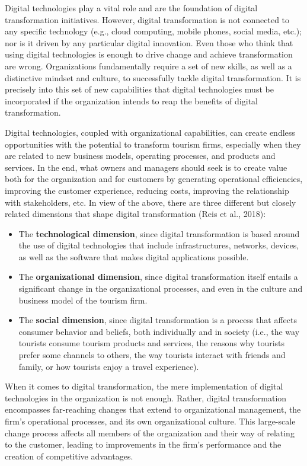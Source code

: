 \documentclass[
  letterpaper,
  DIV=11,
  numbers=noendperiod]{scrreprt}
\begin{document}
Digital technologies play a vital role and are the foundation of digital
transformation initiatives. However, digital transformation is not
connected to any specific technology (e.g., cloud computing, mobile
phones, social media, etc.); nor is it driven by any particular digital
innovation. Even those who think that using digital technologies is
enough to drive change and achieve transformation are wrong.
Organizations fundamentally require a set of new skills, as well as a
distinctive mindset and culture, to successfully tackle digital
transformation. It is precisely into this set of new capabilities that
digital technologies must be incorporated if the organization intends to
reap the benefits of digital transformation.

Digital technologies, coupled with organizational capabilities, can
create endless opportunities with the potential to transform tourism
firms, especially when they are related to new business models,
operating processes, and products and services. In the end, what owners
and managers should seek is to create value both for the organization
and for customers by generating operational efficiencies, improving the
customer experience, reducing costs, improving the relationship with
stakeholders, etc. In view of the above, there are three different but
closely related dimensions that shape digital transformation (Reis et
al., 2018):

\begin{itemize}
\item
  The \textbf{technological dimension}, since digital transformation is
  based around the use of digital technologies that include
  infrastructures, networks, devices, as well as the software that makes
  digital applications possible.
\item
  The \textbf{organizational dimension}, since digital transformation
  itself entails a significant change in the organizational processes,
  and even in the culture and business model of the tourism firm.
\item
  The \textbf{social dimension}, since digital transformation is a
  process that affects consumer behavior and beliefs, both individually
  and in society (i.e., the way tourists consume tourism products and
  services, the reasons why tourists prefer some channels to others, the
  way tourists interact with friends and family, or how tourists enjoy a
  travel experience).
\end{itemize}

When it comes to digital transformation, the mere implementation of
digital technologies in the organization is not enough. Rather, digital
transformation encompasses far-reaching changes that extend to
organizational management, the firm's operational processes, and its own
organizational culture. This large-scale change process affects all
members of the organization and their way of relating to the customer,
leading to improvements in the firm's performance and the creation of
competitive advantages.
\end{document}
